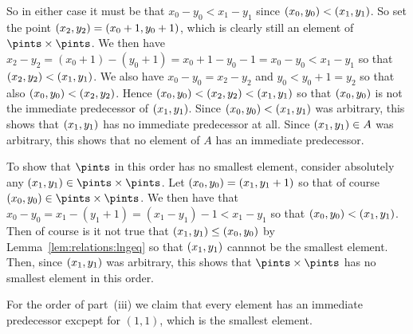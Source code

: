 {{    So in either case it must be that $x_0-y_0 < x_1-y_1$ since $(x_{0}, y_{0}) < (x_{1}, y_{1})$.
    So set the point $(x_{2}, y_{2}) = (x_0+1,y_0+1)$, which is clearly still an element of $\pintss$.
    We then have $x_2-y_2 = (x_0+1)-(y_0+1) = x_0+1-y_0-1 = x_0-y_0 < x_1-y_1$ so that $(x_{2}, y_{2}) < (x_{1}, y_{1})$.
    We also have $x_0-y_0 = x_2-y_2$ and $y_0 < y_0+1 = y_2$ so that also $(x_{0}, y_{0}) < (x_{2}, y_{2})$.
    Hence $(x_{0}, y_{0}) < (x_{2}, y_{2}) < (x_{1}, y_{1})$ so that $(x_{0}, y_{0})$ is not the immediate predecessor of $(x_{1}, y_{1})$.
    Since $(x_{0}, y_{0}) < (x_{1}, y_{1})$ was arbitrary, this shows that $(x_{1}, y_{1})$ has no immediate predecessor at all.
    Since $(x_{1}, y_{1}) \in A$ was arbitrary, this shows that no element of $A$ has an immediate predecessor.

    To show that $\pints$ in this order has no smallest element, consider absolutely any $\ppt{1} \in \pintss$.
    Let $(x_{0}, y_{0}) = (x_1,y_1+1)$ so that of course $\ppt{0} \in \pintss$.
    We then have that $x_0 - y_0 = x_1 - (y_1+1) = (x_1 - y_1) - 1 < x_1 - y_1$ so that $(x_{0}, y_{0}) < (x_{1}, y_{1})$.
    Then of course is it not true that $(x_{1}, y_{1}) \leq (x_{0}, y_{0})$ by Lemma~\ref{lem:relations:lngeq} so that $(x_{1}, y_{1})$ cannnot be the smallest element.
    Then, since $(x_{1}, y_{1})$ was arbitrary, this shows that $\pintss$ has no smallest element in this order.
  }

  For the order of part~(iii) we claim that every element has an immediate predecessor excpept for $(1,1)$, which is the smallest element.
}
